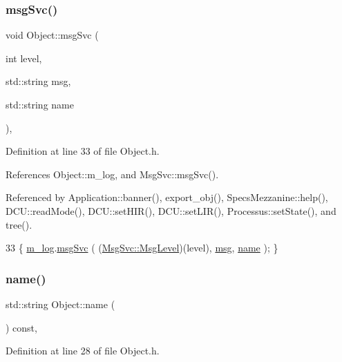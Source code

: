 \subsubsection{\texorpdfstring{msg\+Svc()}{msgSvc()}}
{\footnotesize\ttfamily void Object\+::msg\+Svc (\begin{DoxyParamCaption}\item[{int}]{level,  }\item[{std\+::string}]{msg,  }\item[{std\+::string}]{name }\end{DoxyParamCaption})\hspace{0.3cm}{\ttfamily [inline]}, {\ttfamily [inherited]}}



Definition at line 33 of file Object.\+h.



References Object\+::m\+\_\+log, and Msg\+Svc\+::msg\+Svc().



Referenced by Application\+::banner(), export\+\_\+obj(), Specs\+Mezzanine\+::help(), D\+C\+U\+::read\+Mode(), D\+C\+U\+::set\+H\+I\+R(), D\+C\+U\+::set\+L\+I\+R(), Processus\+::set\+State(), and tree().


\begin{DoxyCode}
33 \{ \hyperlink{classObject_a0d269813dd7ac1f24bc143031e2963f2}{m\_log}.\hyperlink{classMsgSvc_ad25f18047920cc59a314e5098259711c}{msgSvc} ( (\hyperlink{classMsgSvc_ae671eb7301996cd049d2da8a65925926}{MsgSvc::MsgLevel})(level), \hyperlink{classObject_a58b2d0618c2d08cf2383012611528d97}{msg}, 
      \hyperlink{classObject_a300f4c05dd468c7bb8b3c968868443c1}{name} ); \}
\end{DoxyCode}
\mbox{\label{classObject_a300f4c05dd468c7bb8b3c968868443c1}} 
\subsubsection{\texorpdfstring{name()}{name()}}
{\footnotesize\ttfamily std\+::string Object\+::name (\begin{DoxyParamCaption}{ }\end{DoxyParamCaption}) const\hspace{0.3cm}{\ttfamily [inline]}, {\ttfamily [inherited]}}



Definition at line 28 of file Object.\+h.



